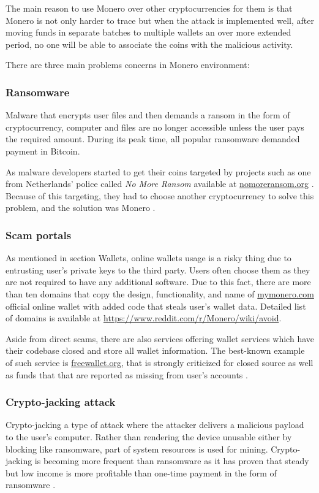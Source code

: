 \documentclass[
  printed, %
  table,   %
  nolof,     %
  nolot,     %
           oneside, color
]{fithesis3}
\begin{document}
The main reason to use Monero over other cryptocurrencies for them is that Monero is not only harder to trace but when the attack is implemented well, after moving funds in separate batches to multiple wallets an over more extended period, no one will be able to associate the coins with the malicious activity.

There are three main problems concerns in Monero environment:
\subsubsection{Ransomware}
Malware that encrypts user files and then demands a ransom in the form of cryptocurrency, computer and files are no longer accessible unless the user pays the required amount. During its peak time, all popular ransomware demanded payment in Bitcoin. 

As malware developers started to get their coins targeted by projects such as one from Netherlands' police called \textit{No More Ransom} available at \url{nomoreransom.org} \cite{martin2017don,paquet2018ransomware}. 
Because of this targeting, they had to choose another cryptocurrency to solve this problem, and the solution was Monero \cite{cusack2018points}.

\subsubsection{Scam portals}
As mentioned in section Wallets, online wallets usage is a risky thing due to entrusting user's private keys to the third party. Users often choose them as they are not required to have any additional software. Due to this fact, there are more than ten domains that copy the design, functionality, and name of \url{mymonero.com} official online wallet with added code that steals user's wallet data. Detailed list of domains is available at \url{https://www.reddit.com/r/Monero/wiki/avoid}.

Aside from direct scams, there are also services offering wallet services which have their codebase closed and store all wallet information. The best-known example of such service is \url{freewallet.org}, that is strongly criticized for closed source as well as funds that that are reported as missing from user's accounts \cite{wijayamonero}.
\subsubsection{Crypto-jacking attack}
Crypto-jacking a type of attack where the attacker delivers a malicious payload to the user's computer. Rather than rendering the device unusable either by blocking like ransomware, part of system resources is used for mining.
Crypto-jacking is becoming more frequent than ransomware as it has proven that steady but low income is more profitable than one-time payment in the form of ransomware \cite{higbee2018role}.
\vspace{-1em}
\end{document}
